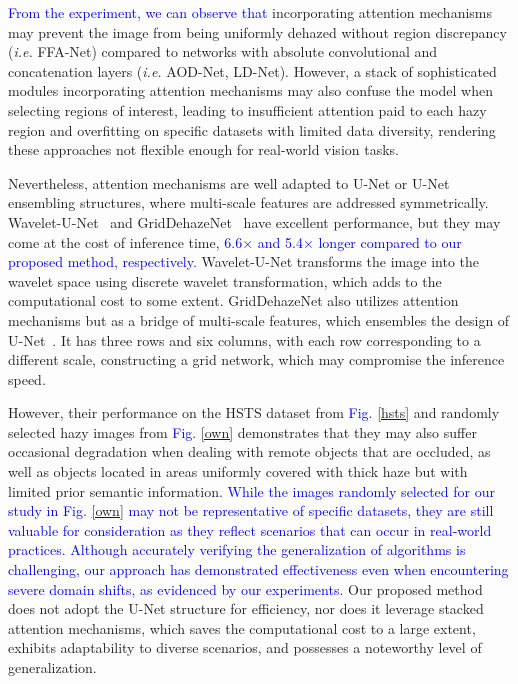 \documentclass[lettersize,journal]{IEEEtran}
\begin{document}
\textcolor{blue}{From the experiment, we can observe that} incorporating attention mechanisms may prevent the image from being uniformly dehazed without region discrepancy (\textit{i.e.} FFA-Net) compared to networks with absolute convolutional and concatenation layers (\textit{i.e.} AOD-Net, LD-Net). However, a stack of sophisticated modules incorporating attention mechanisms may also confuse the model when selecting regions of interest, leading to insufficient attention paid to each hazy region and overfitting on specific datasets with limited data diversity, rendering these approaches not flexible enough for real-world vision tasks. 

Nevertheless, attention mechanisms are well adapted to U-Net or U-Net ensembling structures, where multi-scale features are addressed symmetrically. Wavelet-U-Net~\cite{yang2019wavelet} and GridDehazeNet~\cite{liu2019griddehazenet} have excellent performance, but they may come at the cost of inference time, \textcolor{blue}{6.6$\times$ and 5.4$\times$ longer compared to our proposed method, respectively.} Wavelet-U-Net transforms the image into the wavelet space using discrete wavelet transformation, which adds to the computational cost to some extent. GridDehazeNet also utilizes attention mechanisms but as a bridge of multi-scale features, which ensembles the design of U-Net~\cite{ronneberger2015u}. It has three rows and six columns, with each row corresponding to a different scale, constructing a grid network, which may compromise the inference speed. 

However, their performance on the HSTS dataset from \textcolor{blue}{Fig. \ref{hsts}} and randomly selected hazy images from \textcolor{blue}{Fig. \ref{own}} demonstrates that they may also suffer occasional degradation when dealing with remote objects that are occluded, as well as objects located in areas uniformly covered with thick haze but with limited prior semantic information. \textcolor{blue}{While the images randomly selected for our study in Fig. \ref{own} may not be representative of specific datasets, they are still valuable for consideration as they reflect scenarios that can occur in real-world practices. Although accurately verifying the generalization of algorithms is challenging, our approach has demonstrated effectiveness even when encountering severe domain shifts, as evidenced by our experiments.} Our proposed method does not adopt the U-Net structure for efficiency, nor does it leverage stacked attention mechanisms, which saves the computational cost to a large extent, exhibits adaptability to diverse scenarios, and possesses a noteworthy level of generalization.
\end{document}

